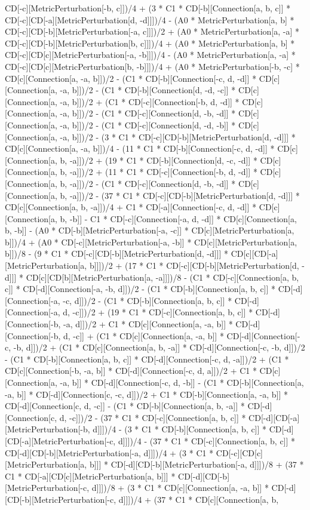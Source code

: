 CD[-c][MetricPerturbation[-b, c]])/4 + (3 * C1 * CD[-b][Connection[a, b, c]] * CD[-c][CD[-a][MetricPerturbation[d, -d]]])/4 - (A0 * MetricPerturbation[a, b] * CD[-c][CD[-b][MetricPerturbation[-a, c]]])/2 + (A0 * MetricPerturbation[a, -a] * CD[-c][CD[-b][MetricPerturbation[b, c]]])/4 + (A0 * MetricPerturbation[a, b] * CD[-c][CD[c][MetricPerturbation[-a, -b]]])/4 - (A0 * MetricPerturbation[a, -a] * CD[-c][CD[c][MetricPerturbation[b, -b]]])/4 + (A0 * MetricPerturbation[-b, -c] * CD[c][Connection[a, -a, b]])/2 - (C1 * CD[-b][Connection[-c, d, -d]] * CD[c][Connection[a, -a, b]])/2 - (C1 * CD[-b][Connection[d, -d, -c]] * CD[c][Connection[a, -a, b]])/2 + (C1 * CD[-c][Connection[-b, d, -d]] * CD[c][Connection[a, -a, b]])/2 - (C1 * CD[-c][Connection[d, -b, -d]] * CD[c][Connection[a, -a, b]])/2 - (C1 * CD[-c][Connection[d, -d, -b]] * CD[c][Connection[a, -a, b]])/2 - (3 * C1 * CD[-c][CD[-b][MetricPerturbation[d, -d]]] * CD[c][Connection[a, -a, b]])/4 - (11 * C1 * CD[-b][Connection[-c, d, -d]] * CD[c][Connection[a, b, -a]])/2 + (19 * C1 * CD[-b][Connection[d, -c, -d]] * CD[c][Connection[a, b, -a]])/2 + (11 * C1 * CD[-c][Connection[-b, d, -d]] * CD[c][Connection[a, b, -a]])/2 - (C1 * CD[-c][Connection[d, -b, -d]] * CD[c][Connection[a, b, -a]])/2 - (37 * C1 * CD[-c][CD[-b][MetricPerturbation[d, -d]]] * CD[c][Connection[a, b, -a]])/4 + C1 * CD[-a][Connection[-c, d, -d]] * CD[c][Connection[a, b, -b]] - C1 * CD[-c][Connection[-a, d, -d]] * CD[c][Connection[a, b, -b]] - (A0 * CD[-b][MetricPerturbation[-a, -c]] * CD[c][MetricPerturbation[a, b]])/4 + (A0 * CD[-c][MetricPerturbation[-a, -b]] * CD[c][MetricPerturbation[a, b]])/8 - (9 * C1 * CD[-c][CD[-b][MetricPerturbation[d, -d]]] * CD[c][CD[-a][MetricPerturbation[a, b]]])/2 + (17 * C1 * CD[-c][CD[-b][MetricPerturbation[d, -d]]] * CD[c][CD[b][MetricPerturbation[a, -a]]])/8 - (C1 * CD[-c][Connection[a, b, c]] * CD[-d][Connection[-a, -b, d]])/2 - (C1 * CD[-b][Connection[a, b, c]] * CD[-d][Connection[-a, -c, d]])/2 - (C1 * CD[-b][Connection[a, b, c]] * CD[-d][Connection[-a, d, -c]])/2 + (19 * C1 * CD[-c][Connection[a, b, c]] * CD[-d][Connection[-b, -a, d]])/2 + C1 * CD[c][Connection[a, -a, b]] * CD[-d][Connection[-b, d, -c]] + (C1 * CD[c][Connection[a, -a, b]] * CD[-d][Connection[-c, -b, d]])/2 + (C1 * CD[c][Connection[a, b, -a]] * CD[-d][Connection[-c, -b, d]])/2 - (C1 * CD[-b][Connection[a, b, c]] * CD[-d][Connection[-c, d, -a]])/2 + (C1 * CD[c][Connection[-b, -a, b]] * CD[-d][Connection[-c, d, a]])/2 + C1 * CD[c][Connection[a, -a, b]] * CD[-d][Connection[-c, d, -b]] - (C1 * CD[-b][Connection[a, -a, b]] * CD[-d][Connection[c, -c, d]])/2 + C1 * CD[-b][Connection[a, -a, b]] * CD[-d][Connection[c, d, -c]] - (C1 * CD[-b][Connection[a, b, -a]] * CD[-d][Connection[c, d, -c]])/2 - (37 * C1 * CD[-c][Connection[a, b, c]] * CD[-d][CD[-a][MetricPerturbation[-b, d]]])/4 - (3 * C1 * CD[-b][Connection[a, b, c]] * CD[-d][CD[-a][MetricPerturbation[-c, d]]])/4 - (37 * C1 * CD[-c][Connection[a, b, c]] * CD[-d][CD[-b][MetricPerturbation[-a, d]]])/4 + (3 * C1 * CD[-c][CD[c][MetricPerturbation[a, b]]] * CD[-d][CD[-b][MetricPerturbation[-a, d]]])/8 + (37 * C1 * CD[-a][CD[c][MetricPerturbation[a, b]]] * CD[-d][CD[-b][MetricPerturbation[-c, d]]])/8 + (3 * C1 * CD[c][Connection[a, -a, b]] * CD[-d][CD[-b][MetricPerturbation[-c, d]]])/4 + (37 * C1 * CD[c][Connection[a, b, 